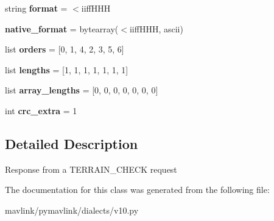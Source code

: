 \begin{DoxyCompactItemize}
string {\bfseries format} = \textquotesingle{}$<$iiff\+H\+HH\textquotesingle{}
\item 
\mbox{\label{classpymavlink_1_1dialects_1_1v10_1_1MAVLink__terrain__report__message_a0025cb577ff28841d4a00336e9b10f9b}} 
{\bfseries native\+\_\+format} = bytearray(\textquotesingle{}$<$iiff\+H\+HH\textquotesingle{}, \textquotesingle{}ascii\textquotesingle{})
\item 
\mbox{\label{classpymavlink_1_1dialects_1_1v10_1_1MAVLink__terrain__report__message_aec69861f781b80ccc35abe381e59d845}} 
list {\bfseries orders} = \mbox{[}0, 1, 4, 2, 3, 5, 6\mbox{]}
\item 
\mbox{\label{classpymavlink_1_1dialects_1_1v10_1_1MAVLink__terrain__report__message_a17d683649210185aeac52dc8cfeda98c}} 
list {\bfseries lengths} = \mbox{[}1, 1, 1, 1, 1, 1, 1\mbox{]}
\item 
\mbox{\label{classpymavlink_1_1dialects_1_1v10_1_1MAVLink__terrain__report__message_acbe0cf5f81a6305de22cb37b3c23d3e2}} 
list {\bfseries array\+\_\+lengths} = \mbox{[}0, 0, 0, 0, 0, 0, 0\mbox{]}
\item 
\mbox{\label{classpymavlink_1_1dialects_1_1v10_1_1MAVLink__terrain__report__message_a5484063e47e247d2b7d175d4c4752358}} 
int {\bfseries crc\+\_\+extra} = 1
\end{DoxyCompactItemize}


\subsection{Detailed Description}
\begin{DoxyVerb}Response from a TERRAIN_CHECK request
\end{DoxyVerb}
 

The documentation for this class was generated from the following file\+:\begin{DoxyCompactItemize}
\item 
mavlink/pymavlink/dialects/v10.\+py\end{DoxyCompactItemize}

